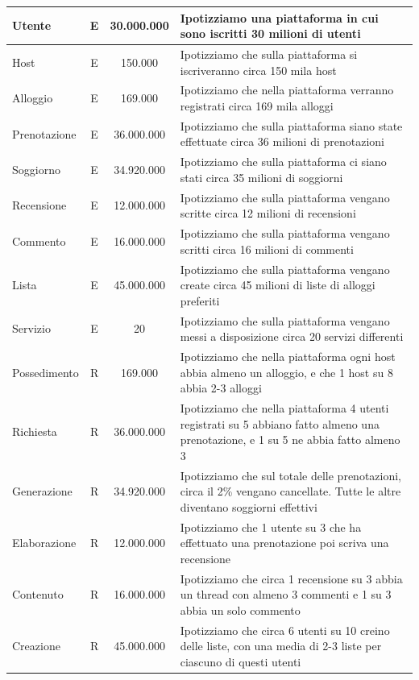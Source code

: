 \begin{longtable}{|l|c|c|p{6.2cm}|}
    Utente & E & 30.000.000 & Ipotizziamo una piattaforma in cui sono iscritti 30 milioni di utenti \\
    \hline
    Host & E & 150.000 & Ipotizziamo che sulla piattaforma si iscriveranno circa 150 mila host \\
    \hline
    Alloggio & E & 169.000 & Ipotizziamo che nella piattaforma verranno registrati circa 169 mila alloggi \\
    \hline
    Prenotazione & E & 36.000.000 & Ipotizziamo che sulla piattaforma siano state effettuate circa 36 milioni di prenotazioni \\
    \hline
    Soggiorno & E & 34.920.000 & Ipotizziamo che sulla piattaforma ci siano stati circa 35 milioni di soggiorni \\
    \hline
    Recensione & E & 12.000.000 & Ipotizziamo che sulla piattaforma vengano scritte circa 12 milioni di recensioni \\
    \hline
    Commento & E & 16.000.000 & Ipotizziamo che sulla piattaforma vengano scritti circa 16 milioni di commenti \\
    \hline
    Lista & E & 45.000.000 & Ipotizziamo che sulla piattaforma vengano create circa 45 milioni di liste di alloggi preferiti \\
    \hline
    Servizio & E & 20 & Ipotizziamo che sulla piattaforma vengano messi a disposizione circa 20 servizi differenti \\
    \hline
    Possedimento & R & 169.000 & Ipotizziamo che nella piattaforma ogni host abbia almeno un alloggio, e che 1 host su 8 abbia 2-3 alloggi \\
    \hline
    Richiesta & R & 36.000.000 & Ipotizziamo che nella piattaforma 4 utenti registrati su 5 abbiano fatto almeno una prenotazione, e 1 su 5 ne abbia fatto almeno 3 \\
    \hline
    Generazione & R & 34.920.000 & Ipotizziamo che sul totale delle prenotazioni, circa il 2\% vengano cancellate. Tutte le altre diventano soggiorni effettivi \\
    \hline
    Elaborazione & R & 12.000.000 & Ipotizziamo che 1 utente su 3 che ha effettuato una prenotazione poi scriva una recensione \\
    \hline
    Contenuto & R & 16.000.000 & Ipotizziamo che circa 1 recensione su 3 abbia un thread con almeno 3 commenti e 1 su 3 abbia un solo commento \\
    \hline
    Creazione & R & 45.000.000 & Ipotizziamo che circa 6 utenti su 10 creino delle liste, con una media di 2-3 liste per ciascuno di questi utenti \\

\end{longtable}
